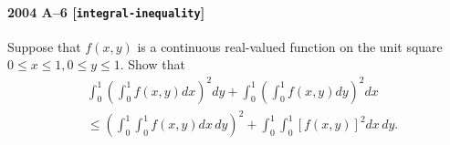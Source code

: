 \paragraph{2004 A--6 \textnormal{[\texttt{integral-inequality}]}}
Suppose that $f(x,y)$ is a continuous real-valued function on the unit
square $0 \le x \le 1, 0 \le y \le 1$. Show that
\begin{align*}
& \int_0^1 \left( \int_0^1  f(x,y) dx \right)^2 dy +
 \int_0^1 \left( \int_0^1  f(x,y) dy \right)^2 dx \\
&\leq
\left( \int_0^1 \int_0^1  f(x,y) dx\, dy \right)^2 +
\int_0^1 \int_0^1 \left[ f(x,y) \right]^2 dx\,dy.
\end{align*}
